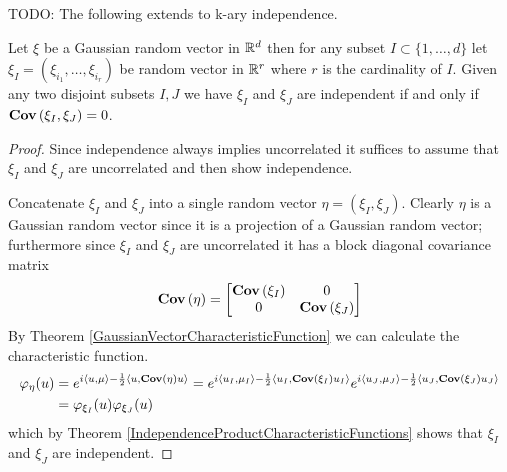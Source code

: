 TODO: The following extends to k-ary independence.
\begin{prop}\label{GaussianIndependence}Let $\xi$ be a Gaussian random
  vector in $\mathbb{R}^d$ then for any subset $I\subset \lbrace 1,
  \dotsc, d \rbrace$ let $\xi_I = (\xi_{i_1}, \dotsc, \xi_{i_r})$ be
  random vector in $\mathbb{R}^r$ where $r$ is the cardinality of $I$.
  Given any two disjoint subsets $I,J$ we have $\xi_I$ and $\xi_J$ are
  independent if and only if $\textbf{Cov} \left (\xi_I, \xi_J \right ) = 0$.  
\end{prop}
\begin{proof}
Since independence always implies uncorrelated it suffices to assume
that $\xi_I$ and $\xi_J$ are uncorrelated and then show independence.

Concatenate $\xi_I$ and $\xi_J$ into a single random vector $\eta=(\xi_I, \xi_J)$.
Clearly $\eta$ is a Gaussian random vector since it is a projection of
a Gaussian random vector; furthermore since $\xi_I$ and $\xi_J$ are
uncorrelated
it has a block diagonal covariance matrix 
\begin{align*}
\textbf{Cov} \left (\eta \right ) = \begin{bmatrix}
\textbf{Cov} \left (\xi_I \right ) & 0 \\
0 & \textbf{Cov} \left (\xi_J \right )
\end{bmatrix}
\end{align*}
By Theorem \ref{GaussianVectorCharacteristicFunction} we can calculate
the characteristic function.  
\begin{align*}
\varphi_\eta(u) &= 
e^{i\langle u, \mu \rangle - \frac{1}{2} \langle u, \textbf{Cov} \left (\eta \right ) u \rangle} 
=e^{i\langle u_I, \mu_I \rangle - \frac{1}{2} \langle u_I, \textbf{Cov} \left (\xi_I \right ) u_I \rangle} 
e^{i\langle u_J, \mu_J \rangle - \frac{1}{2} \langle u_J, \textbf{Cov} \left (\xi_J \right ) u_J \rangle} \\
&= \varphi_{\xi_I}(u) \varphi_{\xi_J}(u)
\end{align*}
which by Theorem \ref{IndependenceProductCharacteristicFunctions} shows that $\xi_I$ and $\xi_J$ are independent.
\end{proof}


